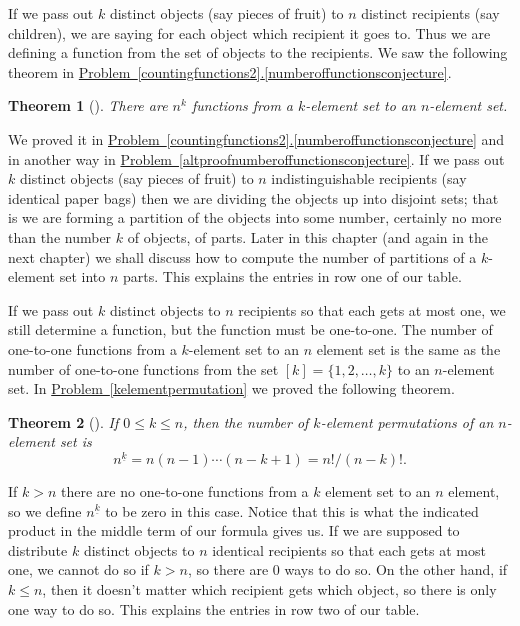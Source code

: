 \documentclass[10pt,]{book}
\theoremstyle{plain}
\newtheorem{theorem}{Theorem}[section]
\theoremstyle{definition}
\theoremstyle{definition}
\numberwithin{equation}{chapter}
\begin{document}
\par
\hypertarget{p-722}{}%
If we pass out \(k\) distinct objects (say pieces of fruit) to \(n\) distinct recipients (say children), we are saying for each object which recipient it goes to. Thus we are defining a function from the set of objects to the recipients. We saw the following theorem in \hyperref[numberoffunctionsconjecture]{Problem~\ref{countingfunctions2}.\ref{numberoffunctionsconjecture}}.%
\begin{theorem}[{}]\label{theorem-3}
\hypertarget{p-723}{}%
There are \(n^k\) functions from a \(k\)-element set to an \(n\)-element set.%
\end{theorem}
\hypertarget{p-724}{}%
We proved it in \hyperref[numberoffunctionsconjecture]{Problem~\ref{countingfunctions2}.\ref{numberoffunctionsconjecture}} and in another way in \hyperref[altproofnumberoffunctionsconjecture]{Problem~\ref{altproofnumberoffunctionsconjecture}}. If we pass out \(k\) distinct objects (say pieces of fruit) to \(n\) indistinguishable recipients (say identical paper bags) then we are dividing the objects up into disjoint sets; that is we are forming a partition of the objects into some number, certainly no more than the number \(k\) of objects, of parts. Later in this chapter (and again in the next chapter) we shall discuss how to compute the number of partitions of a \(k\)-element set into \(n\) parts. This explains the entries in row one of our table.%
\par
\hypertarget{p-725}{}%
If we pass out \(k\) distinct objects to \(n\) recipients so that each gets at most one, we still determine a function, but the function must be one-to-one. The number of one-to-one functions from a \(k\)-element set to an \(n\) element set is the same as the number of one-to-one functions from the set \([k] =\{1,2,\ldots,k\}\) to an \(n\)-element set. In \hyperref[kelementpermutation]{Problem~\ref{kelementpermutation}} we proved the following theorem.%
\begin{theorem}[{}]\label{numberofinjections}
\hypertarget{p-726}{}%
If \(0\le k\le n\), then the number of \(k\)-element permutations of an \(n\)-element set is%
\begin{equation*}
n^{\underline{k}} = n(n-1)\cdots(n-k+1) =
n!/(n-k)!.
\end{equation*}
%
\par
\hypertarget{p-727}{}%
%
\end{theorem}
\hypertarget{p-728}{}%
If \(k>n\) there are no one-to-one functions from a \(k\) element set to an \(n\) element, so we define \(n^{\underline{k}}\) to be zero in this case. Notice that this is what the indicated product in the middle term of our formula gives us. If we are supposed to distribute \(k\) distinct objects to \(n\) identical recipients so that each gets at most one, we cannot do so if \(k>n\), so there are 0 ways to do so. On the other hand, if \(k\le n\), then it doesn't matter which recipient gets which object, so there is only one way to do so. This explains the entries in row two of our table.%
\end{document}
